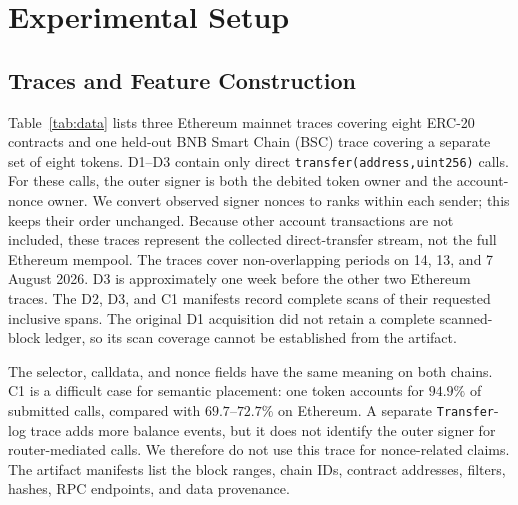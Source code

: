\documentclass[conference,letterpaper]{IEEEtran}
\begin{document}
\section{Experimental Setup}
\label{sec:setup}
\label{sec:method}

\subsection{Traces and Feature Construction}

Table~\ref{tab:data} lists three Ethereum mainnet traces covering eight
ERC-20 contracts and one held-out BNB Smart Chain (BSC) trace covering a
separate set of eight tokens. D1--D3 contain only direct
\texttt{transfer(address,uint256)} calls. For these calls, the outer signer is
both the debited token owner and the account-nonce owner. We convert observed
signer nonces to ranks within each sender; this keeps their order unchanged.
Because other account transactions are not included, these traces represent
the collected direct-transfer stream, not the full Ethereum mempool. The traces
cover non-overlapping periods on 14, 13, and 7 August 2026. D3 is approximately
one week before the other two Ethereum traces. The D2, D3, and C1 manifests
record complete scans of their requested inclusive spans. The original D1
acquisition did not retain a complete scanned-block ledger, so its scan
coverage cannot be established from the artifact.

The selector, calldata, and nonce fields have the same meaning on both
chains. C1 is a difficult case for semantic placement: one token accounts for
$94.9\%$ of submitted calls, compared with $69.7$--$72.7\%$ on Ethereum. A
separate \texttt{Transfer}-log trace adds more balance events, but it does not
identify the outer signer for router-mediated calls. We therefore do not use
this trace for nonce-related claims. The artifact manifests list the block
ranges, chain IDs, contract addresses, filters, hashes, RPC endpoints, and
data provenance.
\end{document}
